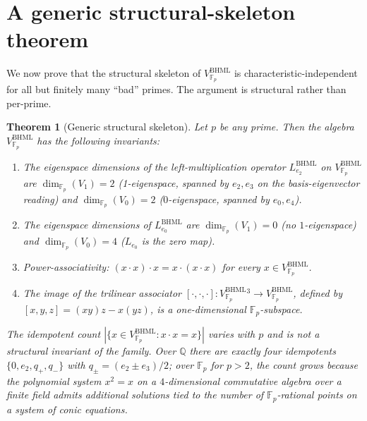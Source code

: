 \documentclass[11pt,reqno]{amsart}
\theoremstyle{plain}
\newtheorem{theorem}{Theorem}[section]
\theoremstyle{definition}
\theoremstyle{remark}
\newcommand{\F}{\mathbb{F}}
\newcommand{\BHML}{\mathrm{BHML}}
\begin{document}
\section{A generic structural-skeleton theorem}
\label{sec:generic}

We now prove that the structural skeleton of $V^{\BHML}_{\F_{p}}$ is
characteristic-independent for all but finitely many ``bad''
primes. The argument is structural rather than per-prime.

\begin{theorem}[Generic structural skeleton]
\label{thm:universality}
Let $p$ be any prime. Then the algebra
$V^{\BHML}_{\F_{p}}$ has the following invariants:
\begin{enumerate}
\item The eigenspace dimensions of the left-multiplication operator
$L_{e_{2}}^{\BHML}$ on $V^{\BHML}_{\F_{p}}$ are
$\dim_{\F_{p}}(V_{1}) = 2$ (1-eigenspace, spanned by $e_{2}, e_{3}$
on the basis-eigenvector reading) and $\dim_{\F_{p}}(V_{0}) = 2$
($0$-eigenspace, spanned by $e_{0}, e_{4}$).
\item The eigenspace dimensions of $L_{e_{0}}^{\BHML}$ are
$\dim_{\F_{p}}(V_{1}) = 0$ (no $1$-eigenspace) and
$\dim_{\F_{p}}(V_{0}) = 4$ ($L_{e_{0}}$ is the zero map).
\item Power-associativity: $(x \cdot x) \cdot x = x \cdot (x \cdot
x)$ for every $x \in V^{\BHML}_{\F_{p}}$.
\item The image of the trilinear associator
$[\cdot, \cdot, \cdot] : V^{\BHML}_{\F_{p}}{}^{3} \to V^{\BHML}_{\F_{p}}$,
defined by $[x, y, z] = (x y) z - x (y z)$, is a one-dimensional
$\F_{p}$-subspace.
\end{enumerate}
The idempotent count $|\{x \in V^{\BHML}_{\F_{p}} : x \cdot x = x\}|$
varies with $p$ and is not a structural invariant of the family. Over
$\mathbb{Q}$ there are exactly four idempotents
$\{0, e_{2}, q_{+}, q_{-}\}$ with $q_{\pm} = (e_{2} \pm e_{3})/2$;
over $\F_{p}$ for $p > 2$, the count grows because the polynomial
system $x^{2} = x$ on a $4$-dimensional commutative algebra over a
finite field admits additional solutions tied to the number of
$\F_{p}$-rational points on a system of conic equations.
\end{theorem}
\end{document}
